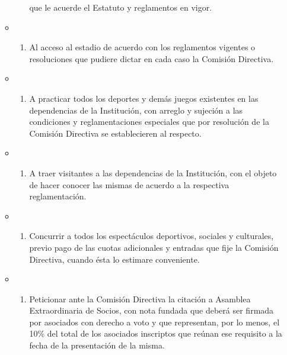 \documentclass[]{book}
\providecommand{\tightlist}{%
  \setlength{\itemsep}{0pt}\setlength{\parskip}{0pt}}
\begin{document}
\begin{itemize}
\begin{itemize}
\begin{enumerate}
      que le acuerde el Estatuto y reglamentos en vigor.
    \end{enumerate}
  \item
    \begin{enumerate}
    \def\labelenumi{\alph{enumi})}
    \setcounter{enumi}{5}
    \tightlist
    \item
      Al acceso al estadio de acuerdo con los reglamentos vigentes o
      resoluciones que pudiere dictar en cada caso la Comisión
      Directiva.
    \end{enumerate}
  \item
    \begin{enumerate}
    \def\labelenumi{\alph{enumi})}
    \setcounter{enumi}{6}
    \tightlist
    \item
      A practicar todos los deportes y demás juegos existentes en las
      dependencias de la Institución, con arreglo y sujeción a las
      condiciones y reglamentaciones especiales que por resolución de la
      Comisión Directiva se establecieren al respecto.
    \end{enumerate}
  \item
    \begin{enumerate}
    \def\labelenumi{\alph{enumi})}
    \setcounter{enumi}{7}
    \tightlist
    \item
      A traer visitantes a las dependencias de la Institución, con el
      objeto de hacer conocer las mismas de acuerdo a la respectiva
      reglamentación.
    \end{enumerate}
  \item
    \begin{enumerate}
    \def\labelenumi{\roman{enumi})}
    \tightlist
    \item
      Concurrir a todos los espectáculos deportivos, sociales y
      culturales, previo pago de las cuotas adicionales y entradas que
      fije la Comisión Directiva, cuando ésta lo estimare conveniente.
    \end{enumerate}
  \item
    \begin{enumerate}
    \def\labelenumi{\alph{enumi})}
    \setcounter{enumi}{9}
    \tightlist
    \item
      Peticionar ante la Comisión Directiva la citación a Asamblea
      Extraordinaria de Socios, con nota fundada que deberá ser firmada
      por asociados con derecho a voto y que representan, por lo menos,
      el 10\% del total de los asociados inscriptos que reúnan ese
      requisito a la fecha de la presentación de la misma.

\end{enumerate}
\end{itemize}
\end{itemize}
\end{document}
